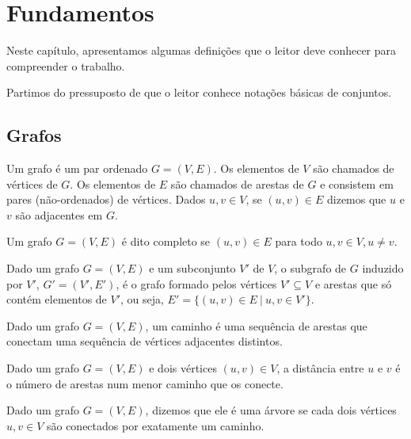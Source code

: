 \chapter{Fundamentos}
\label{cap:fundamentos}

Neste capítulo, apresentamos algumas definições que o leitor deve conhecer para compreender o trabalho.

Partimos do pressuposto de que o leitor conhece notações básicas de conjuntos.

\section{Grafos}

\begin{definition}[grafo]
  \cite{defgrafo}
  Um grafo é um par ordenado $G = (V, E)$. Os elementos de $V$ são chamados de vértices de $G$. Os elementos de $E$ são chamados de arestas de $G$ e consistem em pares (não-ordenados) de vértices. Dados $u, v \in V$, se $(u, v) \in E$ dizemos que $u$ e $v$ são adjacentes em $G$.
\end{definition}

\begin{definition}
  \cite{defgrafocompleto}
  Um grafo $G = (V, E)$ é dito completo se $(u, v) \in E$ para todo $u, v \in V, u \neq v$.
\end{definition}

\begin{definition}
  \cite{defsubgrafo}
  Dado um grafo $G = (V, E)$ e um subconjunto $V'$ de $V$, o subgrafo de $G$ induzido por $V'$, $G' = (V', E')$, é o grafo formado pelos vértices $V' \subseteq V$ e arestas que só contém elementos de $V'$, ou seja, $E' = \{(u, v) \in E \ | \  u, v \in V'\}$.
\end{definition}

\begin{definition}[caminho]
  \cite{defcaminho}
  Dado um grafo $G = (V, E)$, um caminho é uma sequência de arestas que conectam uma sequência de vértices adjacentes distintos.
\end{definition}

\begin{definition}[distância]
  \cite{defdistancia}
  Dado um grafo $G = (V, E)$ e dois vértices $(u, v) \in V$, a distância entre $u$ e $v$ é o número de arestas num menor caminho que os conecte.
\end{definition}

\begin{definition}[árvore]
  \cite{defarvore}
  Dado um grafo $G = (V, E)$, dizemos que ele é uma árvore se cada dois vértices $u, v \in V$ são conectados por exatamente um caminho.
\end{definition}

